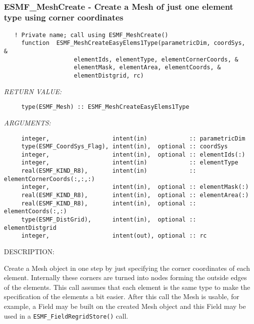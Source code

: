  
\mbox{}\hrulefill\ 
 
\subsubsection [ESMF\_MeshCreate] {ESMF\_MeshCreate - Create a Mesh of just one element type using corner coordinates}


  
\begin{verbatim}   ! Private name; call using ESMF_MeshCreate()
     function  ESMF_MeshCreateEasyElems1Type(parametricDim, coordSys, &
                    elementIds, elementType, elementCornerCoords, &
                    elementMask, elementArea, elementCoords, &
                    elementDistgrid, rc)\end{verbatim}{\em RETURN VALUE:}
\begin{verbatim}     type(ESMF_Mesh) :: ESMF_MeshCreateEasyElems1Type\end{verbatim}{\em ARGUMENTS:}
\begin{verbatim}     integer,                  intent(in)            :: parametricDim
     type(ESMF_CoordSys_Flag), intent(in),  optional :: coordSys
     integer,                  intent(in),  optional :: elementIds(:)
     integer,                  intent(in)            :: elementType
     real(ESMF_KIND_R8),       intent(in)            :: elementCornerCoords(:,:,:)
     integer,                  intent(in),  optional :: elementMask(:)
     real(ESMF_KIND_R8),       intent(in),  optional :: elementArea(:)
     real(ESMF_KIND_R8),       intent(in),  optional :: elementCoords(:,:)
     type(ESMF_DistGrid),      intent(in),  optional :: elementDistgrid
     integer,                  intent(out), optional :: rc\end{verbatim}
{\sf DESCRIPTION:\\ }


     Create a Mesh object in one step by just specifying the corner coordinates of each element.
     Internally these corners are turned into nodes forming the outside edges of the elements.
     This call assumes that each element is the same type to make the specification of the elements
     a bit easier.
     After this call the Mesh is usable, for
     example, a Field may be built on the created Mesh object and
     this Field may be used in a {\tt ESMF\_FieldRegridStore()} call.
  
